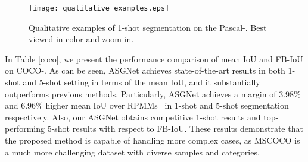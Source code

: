 \begin{figure}[t]
\centering
\texttt{[image: qualitative\_examples.eps]}
\caption{Qualitative examples of 1-shot segmentation on the Pascal-. Best viewed in color and zoom in.}
\vspace{-3mm}
\label{qualitative}
\end{figure}


\vspace{1mm}
 In Table \ref{coco}, we present the performance comparison of mean IoU and FB-IoU on COCO-.
As can be seen, ASGNet achieves state-of-the-art results in both 1-shot and 5-shot setting in terms of the mean IoU, and it substantially outperforms previous methods.
Particularly, ASGNet achieves a margin of 3.98\% and 6.96\% higher mean IoU over RPMMs~\cite{pmms} in 1-shot and 5-shot segmentation respectively.
Also, our ASGNet obtains competitive 1-shot results and top-performing 5-shot results with respect to FB-IoU.
These results demonstrate that the proposed method is capable of handling more complex cases, as MSCOCO is a much more challenging dataset with diverse samples and categories.




%
